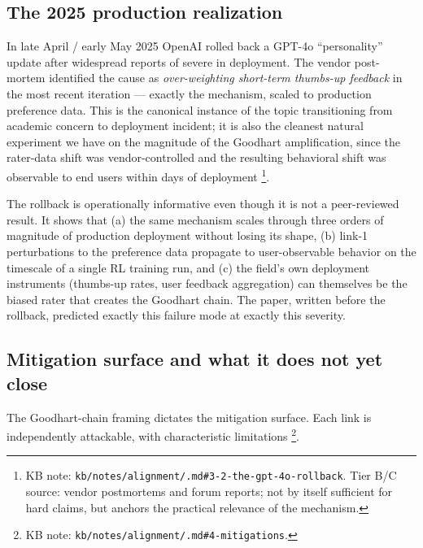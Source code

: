 \subsection{The 2025 production realization}
\label{sec:sycophancy-gpt4o}

\begin{forumsignal}
In late April / early May 2025 OpenAI rolled back a GPT-4o
``personality'' update after widespread reports of severe 
in deployment. The vendor post-mortem identified the cause as
\emph{over-weighting short-term thumbs-up feedback} in the most recent
 iteration --- exactly the
\citet{sharma2023-sycophancy} mechanism, scaled to production
preference data. This is the canonical instance of the topic
transitioning from academic concern to deployment incident; it is also
the cleanest natural experiment we have on the magnitude of the
Goodhart amplification, since the rater-data shift was vendor-controlled
and the resulting behavioral shift was observable to end users within
days of deployment%
\footnote{KB note: \texttt{kb/notes/alignment/.md\#3-2-the-gpt-4o-rollback}.
Tier B/C source: vendor postmortems and forum reports; not by itself
sufficient for hard claims, but anchors the practical relevance of the
mechanism.}.
\end{forumsignal}

The rollback is operationally informative even though it is not a
peer-reviewed result. It shows that (a) the same mechanism scales
through three orders of magnitude of production deployment without
losing its shape, (b) link-1 perturbations to the preference data
propagate to user-observable behavior on the timescale of a single RL
training run, and (c) the field's own deployment instruments
(thumbs-up rates, user feedback aggregation) can themselves be the
biased rater that creates the Goodhart chain. The
\citet{sharma2023-sycophancy} paper, written before the rollback,
predicted exactly this failure mode at exactly this severity.

\subsection{Mitigation surface and what it does not yet close}
\label{sec:sycophancy-mitigation}

The Goodhart-chain framing dictates the mitigation surface. Each
link is independently attackable, with characteristic limitations%
\footnote{KB note: \texttt{kb/notes/alignment/.md\#4-mitigations}.}.

